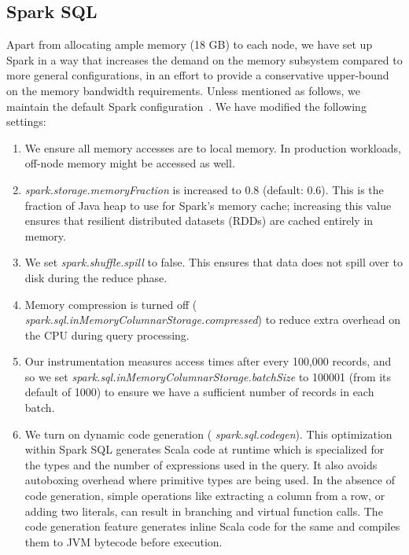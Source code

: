 \documentclass[9pt]{sig-alternate-05-2015}
\begin{document}
\subsection{Spark SQL}

Apart from allocating ample memory (18 GB) to each node, we have set up Spark
in a way that increases the demand on the memory subsystem compared to more
general configurations, in an effort to provide a conservative upper-bound on
the memory bandwidth requirements.  Unless mentioned as follows, we maintain
the default Spark configuration~\cite{sparkConfig}.  We have modified
the following settings:

\begin{enumerate}

\item We ensure all memory accesses are to local memory.  In production
workloads, off-node memory might be accessed as well.

\item {\it spark.storage.memoryFraction} is increased to 0.8 (default: 0.6).
This is the fraction of Java heap to use for Spark's memory cache; increasing
this value ensures that resilient distributed datasets (RDDs) are cached
entirely in memory.

\item We set {\it spark.shuffle.spill} to false. This ensures that data does
not spill over to disk during the reduce phase.

\item Memory compression is turned off ({\it
spark.sql.\-inMemory\-Columnar\-Storage.\-compressed}) to reduce extra overhead
on the CPU during query processing.

\item Our instrumentation measures access times after every 100,000 records,
and so we set {\it spark.sql.\-inMemory\-Columnar\-Storage\-.batch\-Size} to
100001 (from its default of 1000) to ensure we have a sufficient number of
records in each batch.

\item We turn on dynamic code generation ({\it
spark.\-sql.\-code\-gen}).  This optimization within Spark SQL
generates Scala code at runtime which is specialized for the types and the
number of expressions used in the query. It also avoids autoboxing overhead
where primitive types are being used. In the absence of code generation, simple
operations like extracting a column from a row, or adding two literals, can
result in branching and virtual function calls. The code generation feature
generates inline Scala code for the same and compiles them to JVM bytecode
before execution.


\end{enumerate}
\end{document}
